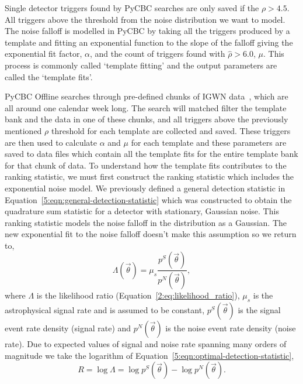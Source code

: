 Single detector triggers found by PyCBC searches are only saved if the $\rho > 4.5$. All triggers above the threshold from the noise distribution we want to model. The noise falloff is modelled in PyCBC by taking all the triggers produced by a template and fitting an exponential function to the slope of the falloff giving the exponential fit factor, $\alpha$, and the count of triggers found with $\hat{\rho} > 6.0$, $\mu$. This process is commonly called `template fitting' and the output parameters are called the `template fits'.

PyCBC Offline searches through pre-defined chunks of IGWN data~\cite{gwtc3:2023}, which are all around one calendar week long. The search will matched filter the template bank and the data in one of these chunks, and all triggers above the previously mentioned $\rho$ threshold for each template are collected and saved. These triggers are then used to calculate $\alpha$ and $\mu$ for each template and these parameters are saved to data files which contain all the template fits for the entire template bank for that chunk of data.
%
% 
To understand how the template fits contributes to the ranking statistic, we must first construct the ranking statistic which includes the exponential noise model. We previously defined a general detection statistic in Equation~\ref{5:eqn:general-detection-statistic} which was constructed to obtain the quadrature sum statistic for a detector with stationary, Gaussian noise. This ranking statistic models the noise falloff in the distribution as a Gaussian. The new exponential fit to the noise falloff doesn't make this assumption so we return to,
%
\begin{equation}
    \Lambda(\Vec{\theta}) = \mu_{s} \frac{p^{S}(\Vec{\theta})}{p^{N}(\Vec{\theta})} ,
    \label{5:eqn:optimal-detection-statistic}
\end{equation}
where $\Lambda$ is the likelihood ratio (Equation~\ref{2:eq:likelihood_ratio}), $\mu_{s}$ is the astrophysical signal rate and is assumed to be constant, $p^{S}(\Vec{\theta})$ is the signal event rate density (signal rate) and $p^{N}(\Vec{\theta})$ is the noise event rate density (noise rate). Due to expected values of signal and noise rate spanning many orders of magnitude we take the logarithm of Equation~\ref{5:eqn:optimal-detection-statistic},
%
\begin{equation}
    R = \log \Lambda = \log p^{S}(\Vec{\theta}) - \log p^{N}(\Vec{\theta}).
    \label{5:eqn:signal-minus-noise-rate}
\end{equation}

